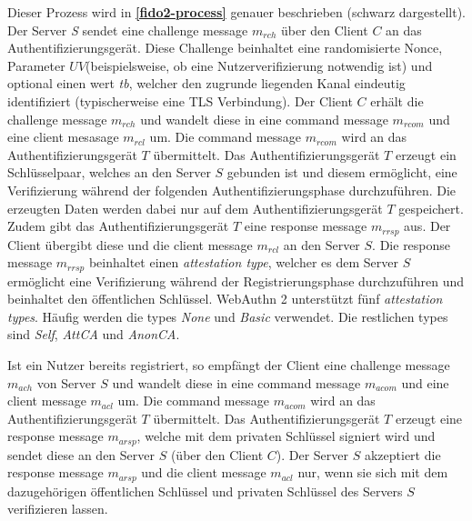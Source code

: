 Dieser Prozess wird in \textbf{\ref{fido2-process}} genauer beschrieben (schwarz dargestellt). Der Server \textit{S} sendet eine challenge message $m_{rch}$ über den Client $C$ an das Authentifizierungsgerät. Diese Challenge beinhaltet eine randomisierte Nonce, Parameter $UV$(beispielsweise, ob eine Nutzerverifizierung notwendig ist) und optional einen wert \textit{tb}, welcher den zugrunde liegenden Kanal eindeutig identifiziert (typischerweise eine \ac{TLS} Verbindung). Der Client $C$ erhält die challenge message $m_{rch}$ und wandelt diese in eine command message $m_{rcom}$ und eine client mesasage $m_{rcl}$ um. Die command message $m_{rcom}$ wird an das Authentifizierungsgerät $T$ übermittelt. Das Authentifizierungsgerät $T$ erzeugt ein Schlüsselpaar, welches an den Server $S$ gebunden ist und diesem ermöglicht, eine Verifizierung während der folgenden Authentifizierungsphase durchzuführen. Die erzeugten Daten werden dabei nur auf dem Authentifizierungsgerät $T$ gespeichert. Zudem gibt das Authentifizierungsgerät $T$ eine response message $m_{rrsp}$ aus. Der Client übergibt diese und die client message $m_{rcl}$ an den Server $S$. Die response message $m_{rrsp}$ beinhaltet einen \textit{attestation type}, welcher es dem Server $S$ ermöglicht eine Verifizierung während der Registrierungsphase durchzuführen und beinhaltet den öffentlichen Schlüssel. WebAuthn 2 unterstützt fünf \textit{attestation types}. Häufig werden die types \textit{None} und \textit{Basic} verwendet. Die restlichen types sind \textit{Self}, \textit{AttCA} und \textit{AnonCA}. \cite{bindel2022fido2}

Ist ein Nutzer bereits registriert, so empfängt der Client eine challenge message $m_{ach}$ von Server $S$ und wandelt diese in eine command message $m_{acom}$ und eine client message $m_{acl}$ um. Die command message $m_{acom}$ wird an das Authentifizierungsgerät $T$ übermittelt. Das Authentifizierungsgerät $T$ erzeugt eine response message $m_{arsp}$, welche mit dem privaten Schlüssel signiert wird und sendet diese an den Server $S$ (über den Client $C$). Der Server $S$ akzeptiert die response message $m_{arsp}$ und die client message $m_{acl}$ nur, wenn sie sich mit dem dazugehörigen öffentlichen Schlüssel und privaten Schlüssel des Servers $S$ verifizieren lassen. \cite{bindel2022fido2}


